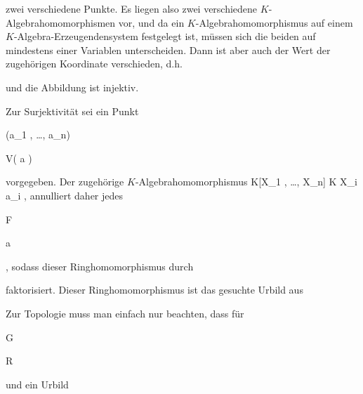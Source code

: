 {{{    }{
}

{   }{
}

}
{}{}{}
zwei verschiedene Punkte. Es liegen also zwei verschiedene $K$-Algebrahomomorphismen vor, und da ein $K$-Algebraho\-momorphismus auf einem $K$-Algebra-Erzeugendensystem festgelegt ist, müssen sich die beiden auf mindestens einer Variablen unterscheiden. Dann ist aber auch der Wert der zugehörigen Koordinate verschieden, d.h.

 und die Abbildung ist injektiv.


Zur Surjektivität sei ein Punkt


\mavergleichskette

{\vergleichskette

{ (a_1 , \ldots ,  a_n)
}

{ \in }{ V( {\mathfrak a} )
}

{  }{
}

{    }{
}

{   }{
}

}
{}{}{}
vorgegeben. Der zugehörige $K$-Algebrahomomorphismus
\maabbeledisp {} { K[X_1 , \ldots ,  X_n] } { K
} { X_i } { a_i
} {,}
annulliert daher jedes


\mavergleichskette

{\vergleichskette

{ F
}

{ \in }{ {\mathfrak a}
}

{  }{
}

{    }{
}

{   }{
}

}
{}{}{,}
sodass dieser Ringhomomorphismus durch

 faktorisiert. Dieser Ringhomomorphismus ist das gesuchte Urbild aus



Zur Topologie muss man einfach nur beachten, dass für


\mavergleichskette

{\vergleichskette

{ G
}

{ \in }{ R
}

{  }{
}

{    }{
}

{   }{
}

}
{}{}{}
und ein Urbild


\mavergleichskette

}
